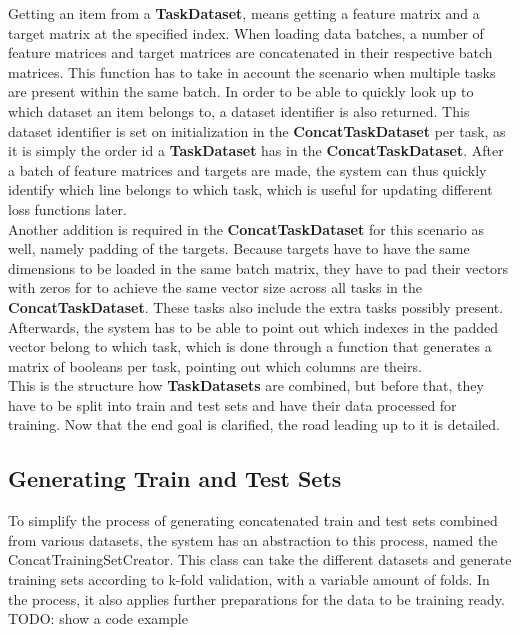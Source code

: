Getting an item from a \textbf{TaskDataset}, means getting a feature matrix and a target matrix at the specified index. When loading data batches, a number of feature matrices and target matrices are concatenated in their respective batch matrices. This function has to take in account the scenario when multiple tasks are present within the same batch. In order to be able to quickly look up to which dataset an item belongs to, a dataset identifier is also returned. This dataset identifier is set on initialization in the \textbf{ConcatTaskDataset} per task, as it is simply the order id a \textbf{TaskDataset} has in the \textbf{ConcatTaskDataset}. After a batch of feature matrices and targets are made, the system can thus quickly identify which line belongs to which task, which is useful for updating different loss functions later. \\

Another addition is required in the \textbf{ConcatTaskDataset} for this scenario as well, namely padding of the targets. Because targets have to have the same dimensions to be loaded in the same batch matrix, they have to pad their vectors with zeros for to achieve the same vector size across all tasks in the \textbf{ConcatTaskDataset}. These tasks also include the extra tasks possibly present. Afterwards, the system has to be able to point out which indexes in the padded vector belong to which task, which is done through a function that generates a matrix of booleans per task, pointing out which columns are theirs. \\

This is the structure how \textbf{TaskDatasets} are combined, but before that, they have to be split into train and test sets and have their data processed for training. Now that the end goal is clarified, the road leading up to it is detailed. \\

\subsection{Generating Train and Test Sets} \label{Impl:DataLoad:GenerateTrainTest}

To simplify the process of generating concatenated train and test sets combined from various datasets, the system has an abstraction to this process, named the ConcatTrainingSetCreator. This class can take the different datasets and generate training sets according to k-fold validation, with a variable amount of folds. In the process, it also applies further preparations for the data to be training ready. \\
TODO: show a code example

